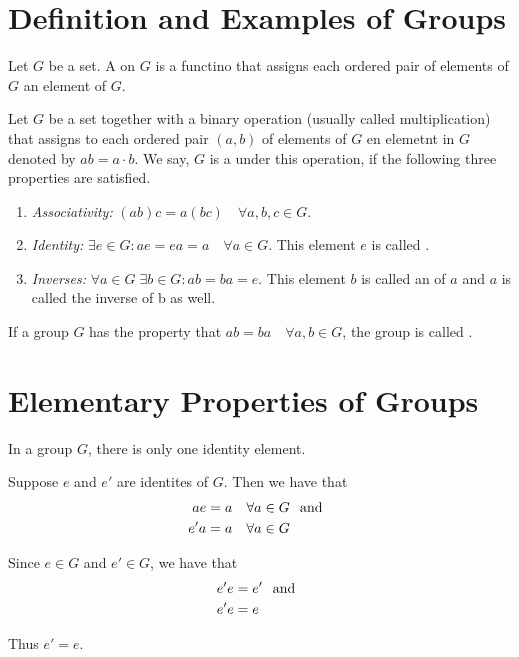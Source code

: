   \section{Definition and Examples of Groups}
\begin{mydef} 
  Let $G$ be a set. A  on $G$ is a functino that assigns each ordered pair of elements of $G$ an element of $G$.
\end{mydef}

\begin{mydef}[Group]
  Let $G$ be a set together with a binary operation (usually called multiplication) that assigns to each ordered pair $(a,b)$ of elements of $G$ en elemetnt in $G$ denoted by $ab = a \cdot b$. We say, $G$ is a  under this operation, if the following three properties are satisfied.
  \begin{enumerate}[label=(\roman*)]
    \item \emph{Associativity:} $(ab)c=a(bc) \quad \forall a,b,c \in G$.
    \item \emph{Identity:} $\exists e \in G: ae = ea = a \quad \forall a\in G$. This element $e$ is called .
    \item \emph{Inverses:} $\forall a \in G \; \exists b \in G: ab = ba = e$. This element $b$ is called an  of $a$ and $a$ is called the inverse of b as well.
  \end{enumerate}

  If a group $G$ has the property that $ab = ba \quad \forall a, b \in G$, the group is called .
\end{mydef}

\section{Elementary Properties of Groups}
\begin{thm}
  In a group $G$, there is only one identity element.
\end{thm}
\begin{prf}
  Suppose $e$ and $e'$ are identites of $G$. Then we have that
  \begin{equation}
    \begin{aligned}
      ae  &= a \quad \forall a \in G \;\;\, \text{and}\;\; \\
      e'a &= a \quad \forall a \in G
    \end{aligned}
  \end{equation}

  Since $e \in G$ and $e' \in G$, we have that
  \begin{equation}
    \begin{aligned}
      e'e  &= e' \;\;\, \text{and}\;\; \\
      e'e  &= e
    \end{aligned}
  \end{equation}

  Thus $e' = e$.
\end{prf}

